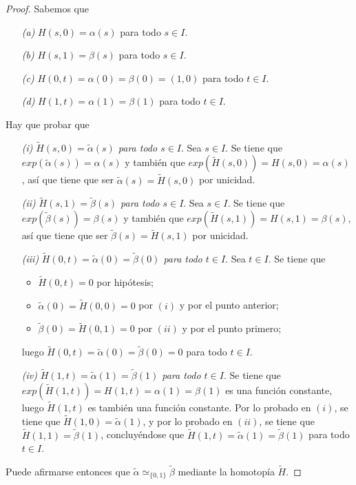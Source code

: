 \documentclass[11pt]{report}
\theoremstyle{definition}
\theoremstyle{definition}
\theoremstyle{remark}
\begin{document}
\begin{proof}
Sabemos que
\begin{itemize}
    \item[\textit{(a)}] $H(s,0) = \alpha(s)$ para todo $s \in I$.
    \item[\textit{(b)}] $H(s,1) = \beta(s)$ para todo $s \in I$.
    \item[\textit{(c)}] $H(0,t) = \alpha(0) = \beta(0) = (1,0)$ para todo $t \in I$.
    \item[\textit{(d)}] $H(1,t) = \alpha(1) = \beta(1)$ para todo $t \in I$.
\end{itemize}
Hay que probar que
\begin{itemize}
    \item[\textit{(i)}] \textit{$\tilde{H}(s,0) = \tilde{\alpha}(s)$ para todo $s \in I$}. Sea $s \in I$. Se tiene que $exp(\tilde{\alpha}(s))=\alpha(s)$ y también que $exp(\tilde{H}(s,0))=H(s,0) = \alpha(s)$, así que tiene que ser $\tilde{\alpha}(s) = \tilde{H}(s,0)$ por unicidad.
    \item[\textit{(ii)}] \textit{$\tilde{H}(s,1) = \tilde{\beta}(s)$ para todo $s \in I$}. Sea $s \in I$. Se tiene que $exp(\tilde{\beta}(s))=\beta(s)$ y también que $exp(\tilde{H}(s,1))=H(s,1) = \beta(s)$, así que tiene que ser $\tilde{\beta}(s) = \tilde{H}(s,1)$ por unicidad.
    \item[\textit{(iii)}] \textit{$\tilde{H}(0,t) = \tilde{\alpha}(0) = \tilde{\beta}(0)$ para todo $t \in I$}. Sea $t \in I$. Se tiene que
    \begin{itemize}
        \item $\tilde{H}(0,t) = 0$ por hipótesis;
        \item $\tilde{\alpha}(0) = \tilde{H}(0,0) = 0$ por $(i)$ y por el punto anterior;
        \item $\tilde{\beta}(0) = \tilde{H}(0,1) = 0$ por $(ii)$ y por el punto primero;
    \end{itemize}
    luego $\tilde{H}(0,t) = \tilde{\alpha}(0) = \tilde{\beta}(0) = 0$ para todo $t \in I$.
    \item[\textit{(iv)}] \textit{$\tilde{H}(1,t) = \tilde{\alpha}(1) = \tilde{\beta}(1)$ para todo $t \in I$}. Se tiene que $exp(\tilde{H}(1,t)) = H(1,t) = \alpha(1) = \beta(1)$ es una función constante, luego $\tilde{H}(1,t)$ es también una función constante. Por lo probado en $(i)$, se tiene que $\tilde{H}(1,0) = \tilde{\alpha}(1)$, y por lo probado en $(ii)$, se tiene que $\tilde{H}(1,1) = \tilde{\beta}(1)$, concluyéndose que $\tilde{H}(1,t) =\tilde{\alpha}(1)=\tilde{\beta}(1)$ para todo $t \in I$.
\end{itemize}
Puede afirmarse entonces que $\tilde{\alpha} \simeq_{\{0,1\}} \tilde{\beta}$ mediante la homotopía $\tilde{H}$.
\end{proof}
\end{document}
